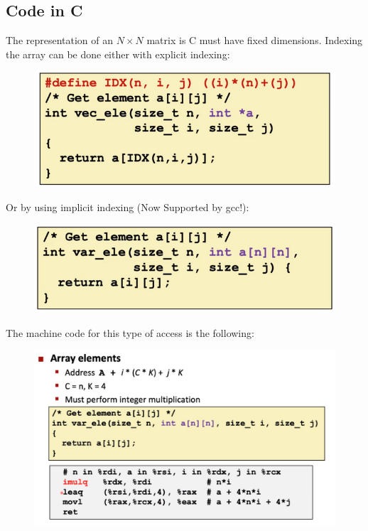 \documentclass[12pt]{book}
\begin{document}
\subsection*{Code in C}
The representation of an $N\times N$ matrix is C must have fixed dimensions. Indexing the
array can be done either with explicit indexing:
\begin{figure}[h]
        \centering
        \includegraphics[scale = 0.4]{./figures/indexing1}
\end{figure}

Or by using implicit indexing (Now Supported by gcc!):
\begin{figure}[h]
        \centering
        \includegraphics[scale = 0.4]{./figures/indexing2}
\end{figure}

The machine code for this type of access is the following:
\begin{figure}[h]
        \centering
        \includegraphics[scale = 0.4]{./figures/nxnindexing}
\end{figure}
\end{document}
